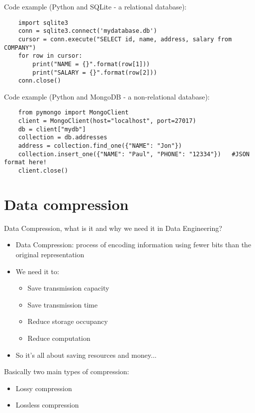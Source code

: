 \documentclass[handout]{beamer}[10pt, usepdftitle=false]
\begin{document}
	\begin{frame}[fragile]
	Code example (Python and SQLite - a relational database):
	\vspace*{0.6em}
	
	\begin{verbatim}
	import sqlite3
	conn = sqlite3.connect('mydatabase.db')
	cursor = conn.execute("SELECT id, name, address, salary from COMPANY")
	for row in cursor:
   		print("NAME = {}".format(row[1]))
   		print("SALARY = {}".format(row[2]))   		
 	conn.close() 		
	\end{verbatim}
 	
	Code example (Python and MongoDB - a non-relational database):
	\vspace*{0.6em}

	\begin{verbatim}
	from pymongo import MongoClient
	client = MongoClient(host="localhost", port=27017)
	db = client["mydb"]
	collection = db.addresses
	address = collection.find_one({"NAME": "Jon"})
	collection.insert_one({"NAME": "Paul", "PHONE": "12334"})	#JSON format here!
	client.close()
	\end{verbatim}

	\end{frame}
	
	\section{Data compression}
	
	\begin{frame}
	
	Data Compression, what is it and why we need it in Data Engineering?
	\vspace*{0.6em}	
	
	\begin{itemize}
		\item{Data Compression: process of encoding information using fewer bits than the original representation}
		\item{We need it to:
			\begin{itemize}
				\item{Save transmission capacity}
				\item{Save transmission time}
				\item{Reduce storage occupancy}
				\item{Reduce computation}	
			\end{itemize}					
		 }
		\item{So it's all about saving resources and money...}
	\end{itemize}
	\vspace*{0.6em}
	
	Basically two main types of compression:
	\vspace*{0.6em}
	
	\begin{itemize}
		\item{Lossy compression}
		\item{Lossless compression}
	\end{itemize}		
	
	\end{frame}
	
\end{document}
